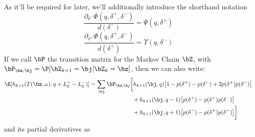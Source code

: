 \documentclass[12pt]{article}
\begin{document}
As it'll be required for later, we'll additionally introduce the shorthand notation
\begin{equation}
\frac{\partial_{\delta^-} \Phi(q, \delta^+, \delta^-)}{d(\delta^-)} = \Psi(q,\delta^+)
\end{equation}
\begin{equation}
\frac{\partial_{\delta^+} \Phi(q, \delta^+, \delta^-)}{d(\delta^+)} = \Upsilon(q,\delta^-)
\end{equation}
If we call $\bP$ the transition matrix for the Markov Chain $\bZ$, with $\bP_{\bz, \bj} = \P[\bZ_{k+1} = \bj | \bZ_k = \bz]$, then we can also write:
\begin{equation}
\begin{split}
\E[h_{k+1}(T(\bz,\omega), q + L_k^+ - L_k^- )] & = \sum_\bj \bP_{\bz,\bj} \biggl[ h_{k+1}(\bj, q) \bigl[ 1 - p(\delta^+) - p(\delta^-) + 2 p(\delta^+) p(\delta^-) \bigr]  \\
& \hphantom{\sum_\bj \bP_{\bz,\bj} \biggl[ {}+{}} + h_{k+1}(\bj, q-1) \bigl[ p(\delta^+)  - p(\delta^+) p(\delta^-) \bigr]   \\
& \hphantom{\sum_\bj \bP_{\bz,\bj} \biggl[ {}+{}} + h_{k+1}(\bj, q+1) \bigl[ p(\delta^-)  - p(\delta^+) p(\delta^-) \bigr] \biggr]  \\
\end{split}
\end{equation}
and its partial derivatives as
\end{document}
